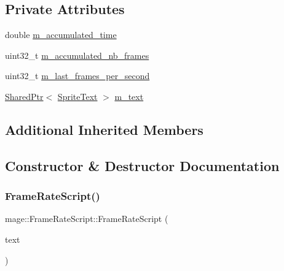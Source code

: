 \subsection*{Private Attributes}
\begin{DoxyCompactItemize}
\item 
double \hyperlink{classmage_1_1_frame_rate_script_ad2811547f84f1c62392e36fd8b82042d}{m\+\_\+accumulated\+\_\+time}
\item 
uint32\+\_\+t \hyperlink{classmage_1_1_frame_rate_script_a96dc980d017ad5e1b1f00db2526cd576}{m\+\_\+accumulated\+\_\+nb\+\_\+frames}
\item 
uint32\+\_\+t \hyperlink{classmage_1_1_frame_rate_script_a6126772a3b500a0c044837f432d10976}{m\+\_\+last\+\_\+frames\+\_\+per\+\_\+second}
\item 
\hyperlink{namespacemage_a1e01ae66713838a7a67d30e44c67703e}{Shared\+Ptr}$<$ \hyperlink{classmage_1_1_sprite_text}{Sprite\+Text} $>$ \hyperlink{classmage_1_1_frame_rate_script_a7d55db21f500e92914293cd6850e3b53}{m\+\_\+text}
\end{DoxyCompactItemize}
\subsection*{Additional Inherited Members}


\subsection{Constructor \& Destructor Documentation}
\hypertarget{classmage_1_1_frame_rate_script_a8ef13ffd08a684cbc2010b0e4594d4cf}{}\label{classmage_1_1_frame_rate_script_a8ef13ffd08a684cbc2010b0e4594d4cf} 
\subsubsection{\texorpdfstring{Frame\+Rate\+Script()}{FrameRateScript()}\hspace{0.1cm}{\footnotesize\ttfamily [1/3]}}
{\footnotesize\ttfamily mage\+::\+Frame\+Rate\+Script\+::\+Frame\+Rate\+Script (\begin{DoxyParamCaption}\item[{\hyperlink{namespacemage_a1e01ae66713838a7a67d30e44c67703e}{Shared\+Ptr}$<$ \hyperlink{classmage_1_1_sprite_text}{Sprite\+Text} $>$}]{text }\end{DoxyParamCaption})\hspace{0.3cm}{\ttfamily [explicit]}}

